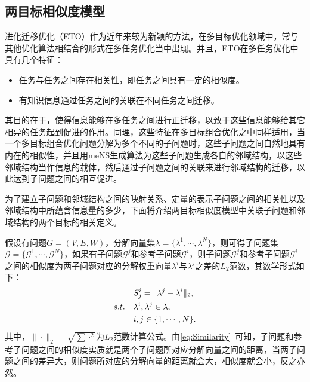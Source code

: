 \subsection{两目标相似度模型}
\label{subsec:NST:邻域结构迁移:两目标相似度模型}
进化迁移优化（ETO）作为近年来较为新颖的方法，在多目标优化领域中，常与其他优化算法相结合的形式在多任务优化当中出现\cite{feng2020explicit,lin2020effective,gupta2016multiobjective}。并且，ETO在多任务优化中具有几个特征：
\begin{itemize}
    \item 任务与任务之间存在相关性，即任务之间具有一定的相似度。
    \item 有知识信息通过任务之间的关联在不同任务之间迁移。
\end{itemize}
其目的在于，使得信息能够在多任务之间进行正迁移，以致于这些信息能够给其它相异的任务起到促进的作用。同理，这些特征在多目标组合优化之中同样适用，当一个多目标组合优化问题分解为多个不同的子问题时，这些子问题之间自然地具有内在的相似性，并且用meNS生成算法为这些子问题生成各自的邻域结构，以这些邻域结构当作信息的载体，然后通过子问题之间的关联来进行邻域结构的迁移，以此达到子问题之间的相互促进。
\par
为了建立子问题和邻域结构之间的映射关系、定量的表示子问题之间的相关性以及邻域结构中所蕴含信息量的多少，下面将介绍两目标相似度模型中关联子问题和邻域结构的两个目标的相关定义。
\par
\begin{definition}
    \label{def:Similarity}
    假设有问题$G = (V,E,W)$，分解向量集$\lambda = \{ \lambda^1, \cdots, \lambda^N \}$，则可得子问题集$\mathcal{G} = \{ \mathcal{G}^1, \cdots , \mathcal{G}^N \}$，如果有子问题$\mathcal{G}^j$和参考子问题$\mathcal{G}^i$，则子问题$\mathcal{G}^j$和参考子问题$\mathcal{G}^i$之间的相似度为两子问题对应的分解权重向量$\lambda^i$与$\lambda^j$之差的$L_2$范数，其数学形式如下：
    \begin{align}
        \label{eq:Similarity}
        & S^i_j  = \|\lambda^j - \lambda^i\|_2, \\
        s.t. \quad & \lambda^i, \lambda^j \in \lambda, \notag \\
        & i,j \in \{1, \cdots, N\}. \notag
    \end{align}
    其中，$\| \cdot \|_2 = \sqrt{\sum \cdot^2}$为$L_2$范数计算公式。由\autoref{eq:Similarity}~可知，子问题和参考子问题之间的相似度实质就是两个子问题所对应分解向量之间的距离，当两子问题之间的差异大，则问题所对应的分解向量的距离就会大，相似度就会小，反之亦然。
\end{definition}
